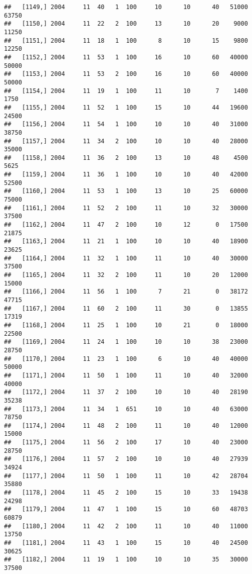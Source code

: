 \documentclass{article}\usepackage[]{graphicx}\usepackage[]{color}
\makeatletter
\newenvironment{kframe}{%
 \def\at@end@of@kframe{}%
 \ifinner\ifhmode%
  \def\at@end@of@kframe{\end{minipage}}%
  \begin{minipage}{\columnwidth}%
 \fi\fi%
 \def\FrameCommand##1{\hskip\@totalleftmargin \hskip-\fboxsep
 \colorbox{shadecolor}{##1}\hskip-\fboxsep
     \hskip-\linewidth \hskip-\@totalleftmargin \hskip\columnwidth}%
 \MakeFramed {\advance\hsize-\width
   \@totalleftmargin\z@ \linewidth\hsize
   \@setminipage}}%
 {\par\unskip\endMakeFramed%
 \at@end@of@kframe}
\newenvironment{knitrout}{}{} %
\makeatother
\begin{document}
\begin{knitrout}
\begin{kframe}
\begin{verbatim}
##   [1149,] 2004     11  40   1  100     10      10      40   51000   63750
##   [1150,] 2004     11  22   2  100     13      10      20    9000   11250
##   [1151,] 2004     11  18   1  100      8      10      15    9800   12250
##   [1152,] 2004     11  53   1  100     16      10      60   40000   50000
##   [1153,] 2004     11  53   2  100     16      10      60   40000   50000
##   [1154,] 2004     11  19   1  100     11      10       7    1400    1750
##   [1155,] 2004     11  52   1  100     15      10      44   19600   24500
##   [1156,] 2004     11  54   1  100     10      10      40   31000   38750
##   [1157,] 2004     11  34   2  100     10      10      40   28000   35000
##   [1158,] 2004     11  36   2  100     13      10      48    4500    5625
##   [1159,] 2004     11  36   1  100     10      10      40   42000   52500
##   [1160,] 2004     11  53   1  100     13      10      25   60000   75000
##   [1161,] 2004     11  52   2  100     11      10      32   30000   37500
##   [1162,] 2004     11  47   2  100     10      12       0   17500   21875
##   [1163,] 2004     11  21   1  100     10      10      40   18900   23625
##   [1164,] 2004     11  32   1  100     11      10      40   30000   37500
##   [1165,] 2004     11  32   2  100     11      10      20   12000   15000
##   [1166,] 2004     11  56   1  100      7      21       0   38172   47715
##   [1167,] 2004     11  60   2  100     11      30       0   13855   17319
##   [1168,] 2004     11  25   1  100     10      21       0   18000   22500
##   [1169,] 2004     11  24   1  100     10      10      38   23000   28750
##   [1170,] 2004     11  23   1  100      6      10      40   40000   50000
##   [1171,] 2004     11  50   1  100     11      10      40   32000   40000
##   [1172,] 2004     11  37   2  100     10      10      40   28190   35238
##   [1173,] 2004     11  34   1  651     10      10      40   63000   78750
##   [1174,] 2004     11  48   2  100     11      10      40   12000   15000
##   [1175,] 2004     11  56   2  100     17      10      40   23000   28750
##   [1176,] 2004     11  57   2  100     10      10      40   27939   34924
##   [1177,] 2004     11  50   1  100     11      10      42   28704   35880
##   [1178,] 2004     11  45   2  100     15      10      33   19438   24298
##   [1179,] 2004     11  47   1  100     15      10      60   48703   60879
##   [1180,] 2004     11  42   2  100     11      10      40   11000   13750
##   [1181,] 2004     11  43   1  100     15      10      40   24500   30625
##   [1182,] 2004     11  19   1  100     10      10      35   30000   37500

\end{verbatim}
\end{kframe}
\end{knitrout}
\end{document}
